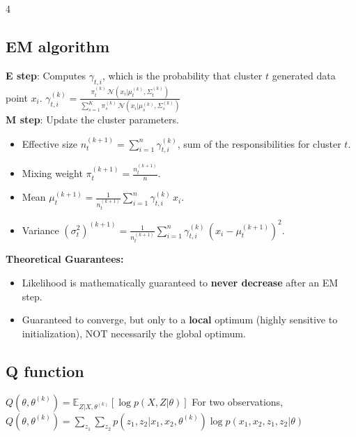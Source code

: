 \documentclass[9pt]{extarticle}
\begin{document}
\begin{multicols*}{4}
\subsection*{EM algorithm}
\textbf{E step}: Computes $\gamma_{t,i}$, which is the probability that cluster $t$ generated data point $x_i$.
$\gamma_{t,i}^{(k)} = \frac{\pi_t^{(k)}\, \mathcal{N}(x_i|\mu_t^{(k)}, \Sigma_t^{(k)})}{\sum_{s=1}^K \pi_s^{(k)}\, \mathcal{N}(x_i|\mu_s^{(k)}, \Sigma_s^{(k)})}$\\
\textbf{M step}: Update the cluster parameters.
\begin{itemize}
    \item Effective size $n_t^{(k+1)} = \sum_{i=1}^n \gamma_{t,i}^{(k)}$, sum of the responsibilities for cluster $t$.
    \item Mixing weight $\pi_t^{(k+1)} = \frac{n_t^{(k+1)}}{n}$.
    \item Mean $\mu_t^{(k+1)} = \frac{1}{n_t^{(k+1)}} \sum_{i=1}^n \gamma_{t,i}^{(k)}\, x_i$.
    \item Variance $(\sigma_t^2)^{(k+1)} = \frac{1}{n_t^{(k+1)}} \sum_{i=1}^n \gamma_{t,i}^{(k)}\, (x_i - \mu_t^{(k+1)})^2$.
\end{itemize}

\textbf{Theoretical Guarantees:}
\begin{itemize}
    \item Likelihood is mathematically guaranteed to \textbf{never decrease} after an EM step.
    \item Guaranteed to converge, but only to a \textbf{local} optimum (highly sensitive to initialization), NOT necessarily the global optimum.
\end{itemize}

\subsection*{Q function}
$Q(\theta, \theta^{(k)}) = \mathbb{E}_{Z|X, \theta^{(k)}} [\log p(X, Z | \theta)]$
For two observations, $Q(\theta, \theta^{(k)}) = \sum_{z_1} \sum_{z_2} p(z_1, z_2 | x_1, x_2, \theta^{(k)}) \log p(x_1, x_2, z_1, z_2 | \theta)$


\end{multicols*}
\end{document}
